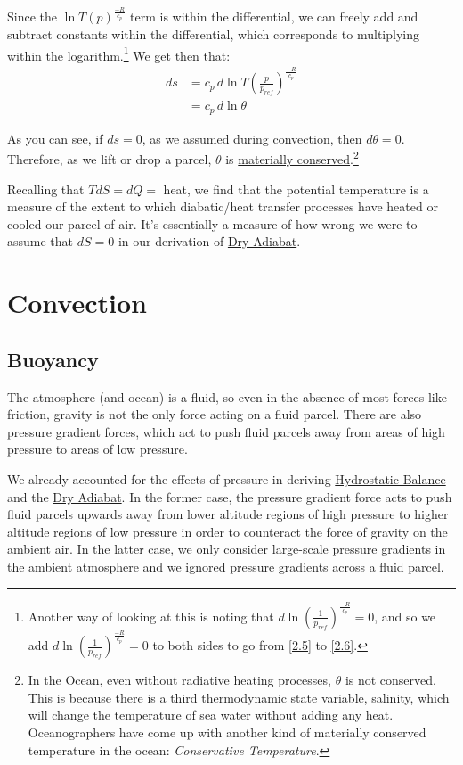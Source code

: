 Since the $\ln T(p)^\frac{-R}{c_p}$ term is within the differential, we can freely add and subtract constants within the differential, which corresponds to multiplying within the logarithm.\footnote{
    Another way of looking at this is noting that $d \ln \left(\frac{1}{p_{ref}}\right)^\frac{-R}{c_p}=0$, and so we add $d \ln \left(\frac{1}{p_{ref}}\right)^\frac{-R}{c_p}=0$ to both sides to go from \ref{2.5} to \ref{2.6}.
} We get then that:
\begin{align}
    \label{2.6}
    ds&=c_p\,d\ln T\left(\frac{p}{p_{ref}}\right)^\frac{-R}{c_p}
    \\
    &=c_p\,d\ln\theta
\end{align}

As you can see, if $ds=0$, as we assumed during convection, then $d\theta=0$. Therefore, as we lift or drop a parcel, $\theta$ is \hyperref[Material Conservation]{materially conserved}.\footnote{In the Ocean, even without radiative heating processes, $\theta$ is not conserved. This is because there is a third thermodynamic state variable, salinity, which will change the temperature of sea water without adding any heat. Oceanographers have come up with another kind of materially conserved temperature in the ocean: \textit{Conservative Temperature}.}

Recalling that $TdS=dQ=$ heat, we find that the potential temperature is a measure of the extent to which diabatic/heat transfer processes have heated or cooled our parcel of air. It's essentially a measure of how wrong we were to assume that $dS=0$ in our derivation of \hyperref[Dry Adiabat]{Dry Adiabat}.

\section{Convection}\label{Convection}

\subsection{Buoyancy}

The atmosphere (and ocean) is a fluid, so even in the absence of most forces like friction, gravity is not the only force acting on a fluid parcel. There are also pressure gradient forces, which act to push fluid parcels away from areas of high pressure to areas of low pressure.

We already accounted for the effects of pressure in deriving \hyperref[Hydrostatic Balance]{Hydrostatic Balance} and the \hyperref[Dry Adiabat]{Dry Adiabat}. In the former case, the pressure gradient force acts to push fluid parcels upwards away from lower altitude regions of high pressure to higher altitude regions of low pressure in order to counteract the force of gravity on the ambient air. In the latter case, we only consider large-scale pressure gradients in the ambient atmosphere and we ignored pressure gradients across a fluid parcel.

